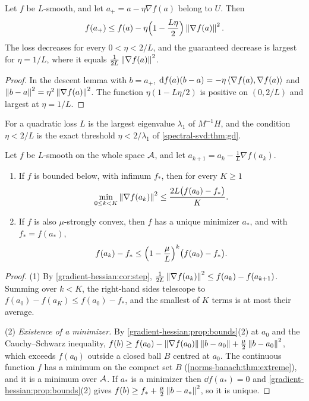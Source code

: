 \begin{notechapter}
\begin{corollary}
\label{gradient-hessian:cor:step}
Let $f$ be $L$-smooth, and let $a_+ = a - \eta\nabla f(a)$ belong to $U$.
Then
\[
  f(a_+)\leq f(a) - \eta\Bigl(1 - \frac{L\eta}2\Bigr)\left\|\nabla f(a)\right\|^2 .
\]
The loss decreases for every $0 < \eta < 2/L$, and the guaranteed decrease
is largest for $\eta = 1/L$, where it equals
$\frac1{2L}\left\|\nabla f(a)\right\|^2$.
\end{corollary}

\begin{proof}
In the descent lemma with $b = a_+$,
$\mathrm{d} f(a)(b - a) = -\eta\left\langle \nabla f(a), \nabla f(a) \right\rangle$ and
$\left\|b - a\right\|^2 = \eta^2\left\|\nabla f(a)\right\|^2$. The function
$\eta(1 - L\eta/2)$ is positive on $(0, 2/L)$ and largest at $\eta = 1/L$.
\end{proof}

For a quadratic loss $L$ is the largest eigenvalue $\lambda_1$ of
$M^{-1}H$, and the condition $\eta < 2/L$ is the exact threshold
$\eta < 2/\lambda_1$ of \cref{spectral-svd:thm:gd}.

\begin{theorem}
\label{gradient-hessian:thm:rates}
Let $f$ be $L$-smooth on the whole space $\mathcal{A}$, and let
$a_{k+1} = a_k - \frac1L\nabla f(a_k)$.
\begin{enumerate}[nosep]
  \item If $f$ is bounded below, with infimum $f_*$, then for every
        $K\geq1$
        \[
          \min_{0\leq k < K}\left\|\nabla f(a_k)\right\|^2
          \leq\frac{2L\bigl(f(a_0) - f_*\bigr)}K .
        \]
  \item If $f$ is also $\mu$-strongly convex, then $f$ has a unique
        minimizer $a_*$, and with $f_* = f(a_*)$,
        \[
          f(a_k) - f_*
          \leq\Bigl(1 - \frac\mu L\Bigr)^k\bigl(f(a_0) - f_*\bigr) .
        \]
\end{enumerate}
\end{theorem}

\begin{proof}
(1) By \cref{gradient-hessian:cor:step},
$\frac1{2L}\left\|\nabla f(a_k)\right\|^2\leq f(a_k) - f(a_{k+1})$. Summing over
$k < K$, the right-hand sides telescope to
$f(a_0) - f(a_K)\leq f(a_0) - f_*$, and the smallest of $K$ terms is at
most their average.

(2) \emph{Existence of a minimizer.} By
\cref{gradient-hessian:prop:bounds}(2) at $a_0$ and the Cauchy--Schwarz
inequality,
$f(b)\geq f(a_0) - \left\|\nabla f(a_0)\right\|\left\|b - a_0\right\|
+ \frac\mu2\left\|b - a_0\right\|^2$,
which exceeds $f(a_0)$ outside a closed ball $B$ centred at $a_0$. The
continuous function $f$ has a minimum on the compact set $B$
(\cref{norms-banach:thm:extreme}), and it is a minimum over $\mathcal{A}$. If
$a_*$ is a minimizer then $\dd f(a_*) = 0$ and
\cref{gradient-hessian:prop:bounds}(2) gives
$f(b)\geq f_* + \frac\mu2\left\|b - a_*\right\|^2$, so it is unique.


\end{proof}
\end{notechapter}
